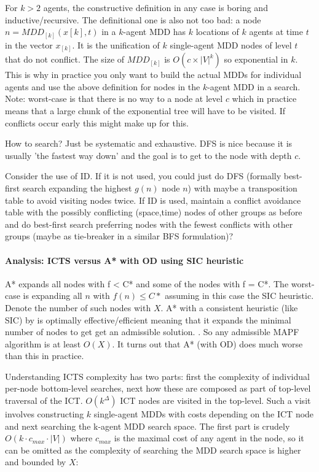 \documentclass[a4paper,10pt,english]{article}
\begin{document}
	For $k > 2$ agents, the constructive definition in any case is boring and inductive/recursive. The definitional one is also not too bad: a node $n = MDD_{[k]}(x[k],t)$ in a $k$-agent MDD has $k$ locations of $k$ agents at time $t$ in the vector $x_[k]$. It is the unification  of $k$ single-agent MDD nodes of level $t$ that do not conflict. The size of $MDD_{[k]}$ is $O(c \times |V| ^k)$ so exponential in $k$. This is why in practice you only want to build the actual MDDs for individual agents and use the above definition for nodes in the $k$-agent MDD in a search. Note: worst-case is that there is no way to a node at level $c$ which in practice means that a large chunk of the exponential tree will have to be visited. If conflicts occur early this might make up for this. 
	
	How to search? Just be systematic and exhaustive. DFS is nice because it is usually 'the fastest way down' and the goal is to get to the node with depth $c$.
	
	Consider the use of ID. If it is not used, you could just do DFS (formally best-first search expanding the highest $g(n)$ node $n$) with maybe a transposition table to avoid visiting nodes twice. If ID is used, maintain a conflict avoidance table with the possibly conflicting (space,time) nodes of other groups as before and do best-first search preferring nodes with the fewest conflicts with other groups (maybe as tie-breaker in a similar BFS formulation)?
	
	\paragraph{Analysis: ICTS versus A* with OD using SIC heuristic}
	A* expands all nodes with f < C* and some of the nodes with f = C*. The worst-case is expanding all $n$ with $f(n) \leq C*$ assuming in this case the SIC heuristic. Denote the number of such nodes with $X$. A* with a consistent heuristic (like SIC) by \cite{dechter1985} is optimally effective/efficient meaning that it expands the minimal number of nodes to get get an admissible solution. . So any admissible MAPF algorithm is at least $O(X)$. It turns out that A* (with OD) does much worse than this in practice.
	
	Understanding ICTS complexity has two parts: first the complexity of individual per-node bottom-level searches, next how these are composed as part of top-level traversal of the ICT. $O(k^\Delta)$ ICT nodes are visited in the top-level. Such a visit involves constructing $k$ single-agent MDDs with costs depending on the ICT node and next searching the k-agent MDD search space. The first part is crudely $O(k\cdot c_{max} \cdot |V|)$ where $c_{max}$ is the maximal cost of any agent in the node, so it can be omitted as the complexity of searching the MDD search space is higher and bounded by $X$:
	
\end{document}
